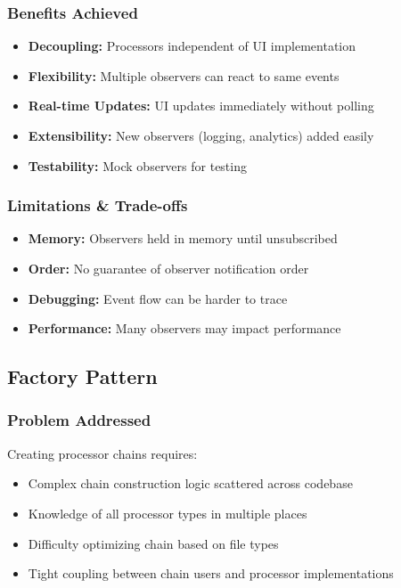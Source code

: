 \documentclass[11pt, a4paper]{article}
\theoremstyle{plain}
\theoremstyle{definition}
\begin{document}
\subsubsection{Benefits Achieved}

\begin{itemize}
    \item \textbf{Decoupling:} Processors independent of UI implementation
    \item \textbf{Flexibility:} Multiple observers can react to same events
    \item \textbf{Real-time Updates:} UI updates immediately without polling
    \item \textbf{Extensibility:} New observers (logging, analytics) added easily
    \item \textbf{Testability:} Mock observers for testing
\end{itemize}

\subsubsection{Limitations \& Trade-offs}

\begin{itemize}
    \item \textbf{Memory:} Observers held in memory until unsubscribed
    \item \textbf{Order:} No guarantee of observer notification order
    \item \textbf{Debugging:} Event flow can be harder to trace
    \item \textbf{Performance:} Many observers may impact performance
\end{itemize}

\subsection{Factory Pattern}

\subsubsection{Problem Addressed}

Creating processor chains requires:
\begin{itemize}
    \item Complex chain construction logic scattered across codebase
    \item Knowledge of all processor types in multiple places
    \item Difficulty optimizing chain based on file types
    \item Tight coupling between chain users and processor implementations
\end{itemize}
\end{document}
